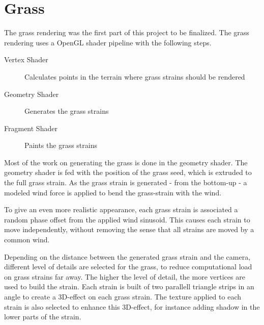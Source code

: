\section{Grass}
\label{cha:grass}
The grass rendering was the first part of this project to be finalized.
The grass rendering uses a OpenGL shader pipeline with the following steps.
\begin{description}
    \item[Vertex Shader] Calculates points in the terrain where grass strains should be rendered
    \item[Geometry Shader] Generates the grass strains
    \item[Fragment Shader] Paints the grass strains
\end{description}

Most of the work on generating the grass is done in the geometry shader.
The geometry shader is fed with the position of the grass seed, which
is extruded to the full grass strain. As the grass strain is generated - from the bottom-up -
a modeled wind force is applied to bend the grass-strain with the wind.

To give an even more realistic appearance, each grass strain is associated a
random phase offset from the applied wind sinusoid.
This causes each strain to move independently, without removing the sense
that all strains are moved by a common wind.


Depending on the distance between the generated grass strain and the camera,
different level of details are selected for the grass, to reduce computational
load on grass strains far away. The higher the level of detail, the more vertices are
used to build the strain. Each strain is built of two parallell triangle strips in an angle
to create a 3D-effect on each grass strain. The texture applied to each strain is also selected
to enhance this 3D-effect, for instance adding shadow in the lower parts of the strain.


